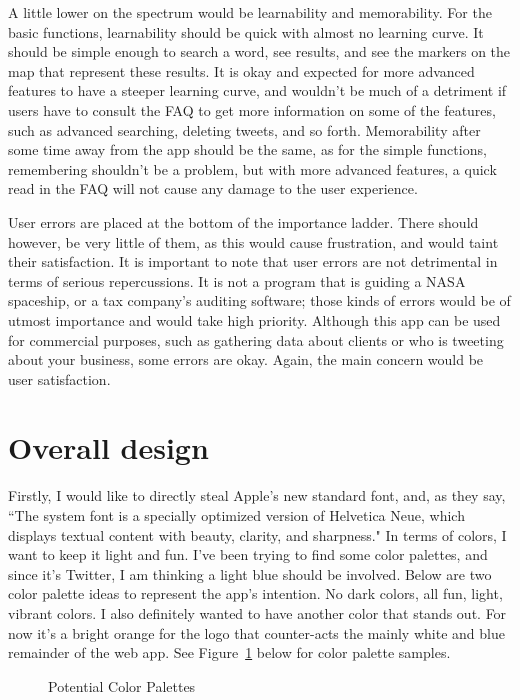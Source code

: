 \documentclass[11pt]{article}
\begin{document}
A little lower on the spectrum would be learnability and memorability. For the basic functions, learnability should be quick with almost no learning curve. It should be simple enough to search a word, see results, and see the markers on the map that represent these results. It is okay and expected for more advanced features to have a steeper learning curve, and wouldn't  be much of a detriment if users have to consult the FAQ to get more information on some of the features, such as advanced searching, deleting tweets, and so forth. Memorability after some time away from the app should be the same, as for the simple functions, remembering shouldn't be a problem, but with more advanced features, a quick read in the FAQ will not cause any damage to the user experience.

User errors are placed at the bottom of the importance ladder. There should however, be very little of them, as this would cause frustration, and would taint their satisfaction. It is important to note that user errors are not detrimental in terms of serious repercussions. It is not a program that is guiding a NASA spaceship, or a tax company's auditing software; those kinds of errors would be of utmost importance and would take high priority. Although this app can be used for commercial purposes, such as gathering data about clients or who is tweeting about your business, some errors are okay. Again, the main concern would be user satisfaction.


\section{Overall design}
Firstly, I would like to directly steal Apple's new standard font, and, as they say, ``The system font is a specially optimized version of Helvetica Neue, which displays textual content with beauty, clarity, and sharpness." In terms of colors, I want to keep it light and fun. I've been trying to find some color palettes, and since it's Twitter, I am thinking a light blue should be involved.  Below are two color palette ideas to represent the app's intention. No dark colors, all fun, light, vibrant colors. I also definitely wanted to have another color that stands out. For now it's a bright orange for the logo that counter-acts the mainly white and blue remainder of the web app. See Figure~\ref{fig:palette} below for color palette samples.

\begin{figure}[H]
    \centering
    \qquad
    \caption{Potential Color Palettes}
    \label{fig:palette}          

\end{figure}
\end{document}
